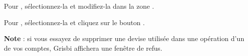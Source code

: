 Pour , sélectionnez-la et modifiez-la dans la zone .

Pour , sélectionnez-la et cliquez sur le bouton .

\textbf{Note} : si vous essayez de supprimer une devise utilisée dans une opération d'un de vos comptes, Grisbi affichera une fenêtre de refus.

%
%



